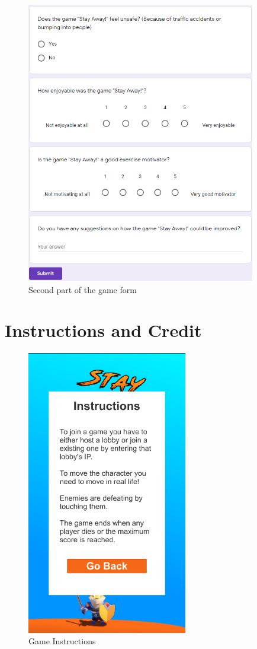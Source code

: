 \documentclass{dissertation}
\begin{document}
\begin{appendices}
\begin{figure}[H]
\centering
\includegraphics[width = 10cm]{images/game-form2.png}
\caption{Second part of the game form}
\label{fig:gf2}
\end{figure}

\chapter{Instructions and Credit}

\begin{figure}[H]
\centering
\includegraphics[width = 7cm]{images/final-ui7.png}
\caption{Game Instructions}
\label{fig:f7}
\end{figure}


\end{appendices}
\end{document}
